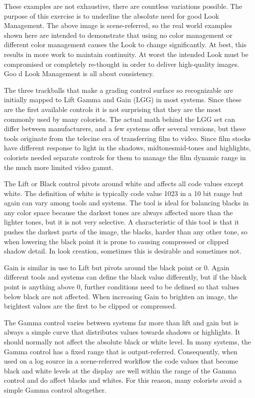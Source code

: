 These examples are not exhaustive, there are countless variations possible. The purpose of this exercise is to underline the absolute need for good Look Management. The above image is scene-referred, so the real world examples shown here are intended to demonstrate that using no color management or different color management causes the Look to change significantly. At best, this results in more work to maintain continuity. At worst the intended Look must be compromised or completely re-thought in order to deliver high-quality images. Goo d Look Management is all about consistency.

The three trackballs that make a grading control surface so recognizable are initially mapped to Lift Gamma and Gain (LGG) in most systems. Since these are the first available controls it is not surprising that they are the most commonly used by many colorists. The actual math behind the LGG set can differ between manufacturers, and a few systems offer several versions, but these tools originate from the telecine era of transferring film to video. Since film stocks have different response to light in the shadows, midtonesmid-tones and highlights, colorists needed separate controls for them to manage the film dynamic range in the much more limited video gamut.

The Lift or Black control pivots around white and affects all code values except white. The definition of white is typically code value 1023 in a 10 bit range but again can vary among tools and systems. The tool is ideal for balancing blacks in any color space because the darkest tones are always affected more than the lighter tones, but it is not very selective. A characteristic of this tool is that it pushes the darkest parts of the image, the blacks, harder than any other tone, so when lowering the black point it is prone to causing compressed or clipped shadow detail. In look creation, sometimes this is desirable and sometimes not.

Gain is similar in use to Lift but pivots around the black point or 0. Again different tools and systems can define the black value differently, but if the black point is anything above 0, further conditions need to be defined so that values below black are not affected. When increasing Gain to brighten an image, the brightest values are the first to be clipped or compressed.

The Gamma control varies between systems far more than lift and gain but is always a simple curve that distributes values towards shadows or highlights. It should normally not affect the absolute black or white level. In many systems, the Gamma control has a fixed range that is output-referred. Consequently, when used on a log source in a scene-referred workflow the code values that become black and white levels at the display are well within the range of the Gamma control and do affect blacks and whites. For this reason, many colorists avoid a simple Gamma control altogether.



